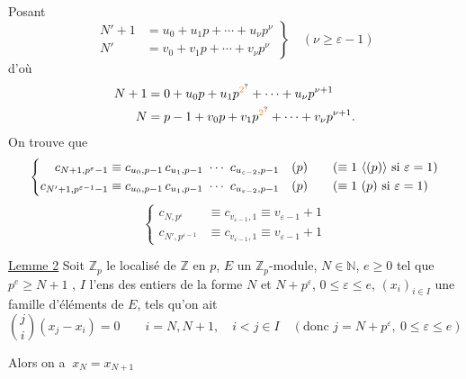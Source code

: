 Posant
\[
\left.\begin{aligned}
N'+1&=u_0+u_1p+\cdots+u_\nu p^\nu\\
N'&=v_0+v_1p+\cdots+v_\nu p^\nu
\end{aligned}\right\}\quad(\nu\geq\varepsilon-1)
\]
d'où
\[
\begin{aligned}
N+1&=0+u_0p+u_1p^{\unsure{2}}+\cdots+u_\nu p^{\nu+1}\\
N&=p-1+v_0p+v_1p^{\unsure{2}}+\cdots+v_\nu p^{\nu+1}.
\end{aligned}
\]
On trouve que
\[
\left\{\begin{aligned}
c_{N+1,p^\varepsilon-1}&\equiv c_{u_0,p-1}\,c_{u_1,p-1}\ \cdots\ c_{u_{\varepsilon-2},p-1}\quad(p)\qquad(\equiv1\ \inserted{(p)}\ \text{si }\varepsilon=1)\\
c_{N'+1,p^{\varepsilon-1}-1}&\equiv c_{u_0,p-1}\,c_{u_1,p-1}\ \cdots\ c_{u_{\varepsilon-2},p-1}\quad(p)\qquad(\equiv1\ (p)\ \text{si }\varepsilon=1)
\end{aligned}\right.
\]
\[
\left\{\begin{aligned}
c_{N,p^\varepsilon}&\equiv c_{v_{\varepsilon-1},1}\equiv v_{\varepsilon-1}+1\\
c_{N',p^{\varepsilon-1}}&\equiv c_{v_{\varepsilon-1},1}\equiv v_{\varepsilon-1}+1
\end{aligned}\right.
\]

\uline{Lemme 2} Soit $\mathbb{Z}_p$ le localisé de $\mathbb{Z}$ en $p$, $E$ un $\mathbb{Z}_p$-module, $N\in\mathbb{N}$, $e\geq0$ tel que $p^e\geq N+1$ , $I$ l'ens des entiers de la forme $N$ et $N+p^\varepsilon$, $0\leq\varepsilon\leq e$, $(x_i)_{i\in I}$ une famille d'éléments de $E$, tels qu'on ait
\[
\binom{j}{i}(x_j-x_i)=0\qquad i=N,N+1,\quad i<j\in I\quad(\text{donc }j=N+p^\varepsilon,\ 0\leq\varepsilon\leq e)
\]

 Alors on a $\ x_N=x_{N+1}$

